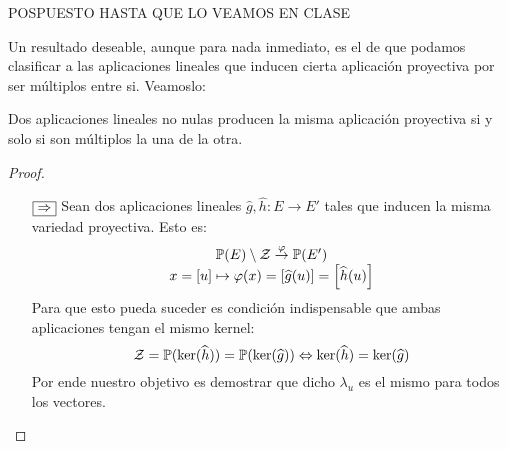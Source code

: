 POSPUESTO HASTA QUE LO VEAMOS EN CLASE

Un resultado deseable, aunque para nada inmediato, es el de que podamos clasificar a las aplicaciones lineales que inducen cierta aplicación proyectiva por ser múltiplos entre si. Veamoslo:
\begin{theo}
	\label{C4_teo_lemaCorrespondencia}
	Dos aplicaciones lineales no nulas producen la misma aplicación proyectiva si y solo si son múltiplos la una de la otra.
\end{theo}
\begin{proof}
	\begin{itemize}
		\item[$\fbox{$\Rightarrow$}$] Sean dos aplicaciones lineales $\widehat{g},\widehat{h}:E\to E'$ tales que inducen la misma variedad proyectiva. Esto es:
		\[\begin{array}{c}
		\mathbb{P}(E)\setminus\mathcal{Z}\stackrel{\varphi}{\to}\mathbb{P}(E')\\
		x=\left [ u \right ]\mapsto\varphi(x)=\left [ \widehat{g}(u) \right ]=\left [ \widehat{h}(u) \right ]
		\end{array}\]
		Para que esto pueda suceder es condición indispensable que ambas aplicaciones tengan el mismo kernel:
		\[\mathcal{Z}=\mathbb{P}(\ker(\widehat{h}))=\mathbb{P}(\ker(\widehat{g}))\Leftrightarrow \ker(\widehat{h})=\ker(\widehat{g})\]
		Por ende nuestro objetivo es demostrar que dicho $\lambda_u$ es el mismo para todos los vectores.
		

\end{itemize}
\end{proof}
